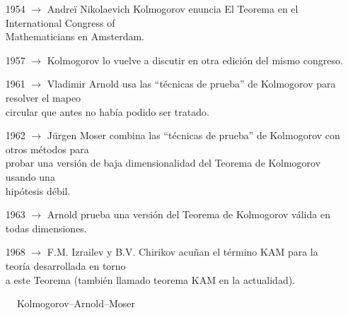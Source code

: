 \documentclass[8pt]{beamer}
\renewcommand{\>}{\rangle}
\newcommand{\<}{\langle}
\begin{document}
\begin{frame}
\begin{itemize}
\pause
\item[1954] $\longrightarrow$ Andre\"i Nikolaevich Kolmogorov enuncia El Teorema en el International Congress of \\ \hspace{13pt} Mathematicians en Amsterdam. \pause
\item[1957] $\longrightarrow$ Kolmogorov lo vuelve a discutir en otra edición del mismo congreso.
\pause
\item[1961] $\longrightarrow$ Vladimir Arnold usa las ``técnicas de prueba'' de Kolmogorov para resolver el mapeo \\ \hspace{13pt} circular que antes no había podido ser tratado.
\pause
\item[1962] $\longrightarrow$ J\"urgen Moser combina las ``técnicas de prueba'' de Kolmogorov con otros métodos para \\ \hspace{13pt} probar una versión de baja dimensionalidad del Teorema de Kolmogorov usando una \\ \hspace{13pt} hipótesis débil.
\pause
\item[1963] $\longrightarrow$ Arnold prueba una versión del Teorema de Kolmogorov válida en todas dimensiones.
\pause
\item[1968] $\longrightarrow$ F.M. Izrailev y B.V. Chirikov acuñan el término KAM para la teoría desarrollada en torno \\ \hspace{13pt} a este Teorema (también llamado teorema KAM en la actualidad). 
\end{itemize}
\pause
\begin{figure}[b]
\caption{Kolmogorov--Arnold--Moser}
\end{figure}


\vspace{-8cm}
\end{frame}
\end{document}
